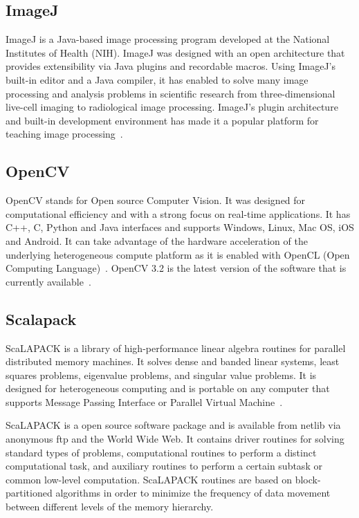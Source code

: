     \pv

\subsection{ImageJ}

ImageJ is a Java-based image processing program developed at the
National Institutes of Health (NIH). ImageJ was designed with an open
architecture that provides extensibility via Java plugins and
recordable macros.  Using ImageJ's built-in editor and a Java
compiler, it has enabled to solve many image processing and analysis
problems in scientific research from three-dimensional live-cell
imaging to radiological image processing.  ImageJ's plugin
architecture and built-in development environment has made it a
popular platform for teaching image processing~\cite{www-imagej}.

\subsection{OpenCV}

OpenCV stands for Open source Computer Vision. It was designed for
computational efficiency and with a strong focus on real-time
applications. It has C++, C, Python and Java interfaces and supports
Windows, Linux, Mac OS, iOS and Android. It can take advantage of the
hardware acceleration of the underlying heterogeneous compute platform
as it is enabled with OpenCL (Open Computing
Language)~\cite{www-opencv}. OpenCV 3.2 is the latest version of the
software that is currently available~\cite{opencv-version}.

\subsection{Scalapack}

ScaLAPACK is a library of high-performance linear algebra routines for
parallel distributed memory machines. It solves dense and banded
linear systems, least squares problems, eigenvalue problems, and
singular value problems. It is designed for heterogeneous computing
and is portable on any computer that supports Message Passing
Interface or Parallel Virtual Machine~\cite{www-scalapack}.

    ScaLAPACK is a open source software package and is available from
    netlib via anonymous ftp and the World Wide Web. It contains driver
    routines for solving standard types of problems, computational
    routines to perform a distinct computational task, and auxiliary
    routines to perform a certain subtask or common low-level
    computation. ScaLAPACK routines are based on block-partitioned
    algorithms in order to minimize the frequency of data movement between
    different levels of the memory hierarchy.
    
